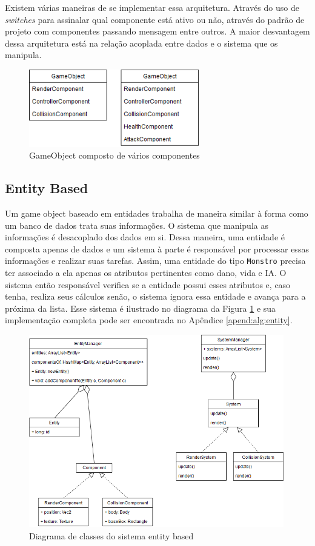 \documentclass[12pt, 
openright, 
oneside, 
a4paper,    
brazil]{facom-ufu-abntex2}
\begin{document}
Existem várias maneiras de se implementar essa arquitetura. Através do uso de \textit{switches} para assinalar qual componente está ativo ou não, através do padrão de projeto com componentes passando mensagem entre outros. A maior desvantagem dessa arquitetura está na relação acoplada entre dados e o sistema que os manipula.

\begin{figure}[H]
	\centering
	\includegraphics[width=20em]{imagens/componentBased.png}
	\caption{GameObject composto de vários componentes}
\end{figure}


\subsection{Entity Based}
Um game object baseado em entidades trabalha de maneira similar à forma como um banco de dados trata suas informações. O sistema que manipula as informações é desacoplado dos dados em si. Dessa maneira, uma entidade é composta apenas de dados e um sistema à parte é responsável por processar essas informações e realizar suas tarefas.
Assim, uma entidade do tipo \texttt{Monstro} precisa ter associado a ela apenas os atributos pertinentes como dano, vida e IA. O sistema então responsável verifica se a entidade possui esses atributos e, caso tenha, realiza seus cálculos senão, o sistema ignora essa entidade e avança para a próxima da lista. Esse sistema é ilustrado no diagrama da Figura \ref{fig:entityDiagram} e sua implementação completa pode ser encontrada no Apêndice \ref{apend:alg:entity}.

\begin{figure}[H]
	\centering
	\includegraphics[width=30em]{imagens/entityDiagram.png}
	\caption{Diagrama de classes do sistema entity based}
	 \label{fig:entityDiagram}
\end{figure}
\end{document}
